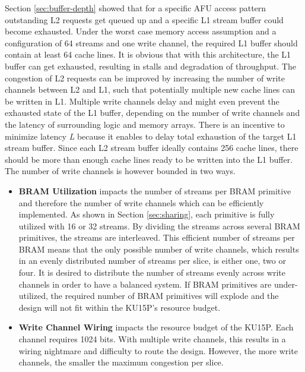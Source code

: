 
Section \ref{sec:buffer-depth} showed that for a specific AFU access pattern outstanding L2 requests get queued up and a specific L1 stream buffer could become exhausted. Under the worst case memory access assumption and a configuration of 64 streams and one write channel, the required L1 buffer should contain at least 64 cache lines. It is obvious that with this architecture, the L1 buffer can get exhausted, resulting in stalls and degradation of throughput. The congestion of L2 requests can be improved by increasing the number of write channels between L2 and L1, such that potentially multiple new cache lines can be written in L1. Multiple write channels delay and might even prevent the exhausted state of the L1 buffer, depending on the number of write channels and the latency of surrounding logic and memory arrays. There is an incentive to minimize latency \textit{L} because it enables to delay total exhaustion of the target L1 stream buffer. Since each L2 stream buffer ideally contains 256 cache lines, there should be more than enough cache lines ready to be written into the L1 buffer. The number of write channels is however bounded in two ways.

\begin{itemize}
  \item{\textbf{BRAM Utilization} impacts the number of streams per BRAM primitive and therefore the number of write channels which can be efficiently implemented. As shown in Section \ref{sec:sharing}, each primitive is fully utilized with 16 or 32 streams. By dividing the streams across several BRAM primitives, the streams are interleaved. This efficient number of streams per BRAM means that the only possible number of write channels, which results in an evenly distributed number of streams per slice, is either one, two or four. It is desired to distribute the number of streams evenly across write channels in order to have a balanced system. If BRAM primitives are under-utilized, the required number of BRAM primitives will explode and the design will not fit within the KU15P's resource budget.}
  \item{\textbf{Write Channel Wiring} impacts the resource budget of the KU15P. Each channel requires 1024 bits. With multiple write channels, this results in a wiring nightmare and difficulty to route the design. However, the more write channels, the smaller the maximum congestion per slice.}
\end{itemize}

